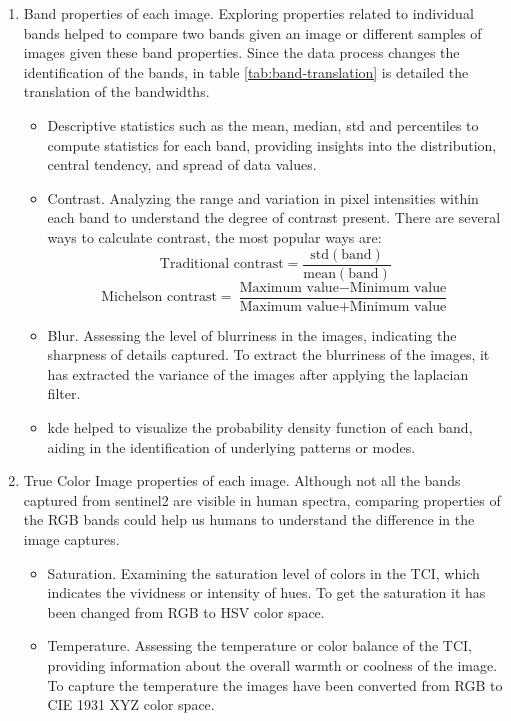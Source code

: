 \begin{enumerate}
	\item Band properties of each image. Exploring properties related to individual bands helped to compare two bands given an image or different samples of images given these band properties. Since the data process changes the identification of the bands, in table \ref{tab:band-translation} is detailed the translation of the bandwidths.
	\begin{itemize}
		\item Descriptive statistics such as the mean, median, std and percentiles to compute  statistics for each band, providing insights into the distribution, central tendency, and spread of data values.
		\item Contrast. Analyzing the range and variation in pixel intensities within each band to understand the degree of contrast present. There are several ways to calculate contrast, the most popular ways are:
		\[\text{Traditional contrast} = \frac{\text{std}(\text{band})}{\text{mean}(\text{band})}\]
		\[\text{Michelson contrast} = \frac{\text{Maximum value} - \text{Minimum value}}{\text{Maximum value} + \text{Minimum value}}\]
		\item Blur. Assessing the level of blurriness in the images, indicating the sharpness of details captured. To extract the blurriness of the images, it has extracted the variance of the images after applying the laplacian filter.
		\item \gls{kde} helped to visualize the probability density function of each band, aiding in the identification of underlying patterns or modes.
	\end{itemize}
	\item True Color Image properties of each image. Although not all the bands captured from sentinel2 are visible in human spectra, comparing properties of the RGB bands could help us humans to understand the difference in the image captures.
	\begin{itemize}
		\item Saturation. Examining the saturation level of colors in the TCI, which indicates the vividness or intensity of hues. To get the saturation it has been changed from RGB to HSV color space.
		\item Temperature. Assessing the temperature or color balance of the TCI, providing information about the overall warmth or coolness of the image. To capture the temperature the images have been converted from RGB to CIE 1931 XYZ color space.
	\end{itemize}

\end{enumerate}
